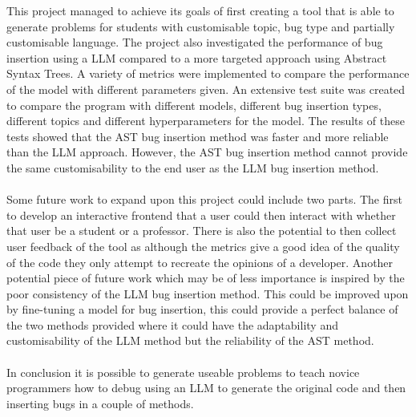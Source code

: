 \documentclass[12pt]{extarticle}
\begin{document}
This project managed to achieve its goals of first creating a tool that is able to generate problems for students with customisable topic, bug type and partially customisable language. The project also investigated the performance of bug insertion using a LLM compared to a more targeted approach using Abstract Syntax Trees. A variety of metrics were implemented to compare the performance of the model with different parameters given. An extensive test suite was created to compare the program with different models, different bug insertion types, different topics and different hyperparameters for the model. The results of these tests showed that the AST bug insertion method was faster and more reliable than the LLM approach. However, the AST bug insertion method cannot provide the same customisability to the end user as the LLM bug insertion method.\\
\\
Some future work to expand upon this project could include two parts. The first to develop an interactive frontend that a user could then interact with whether that user be a student or a professor. There is also the potential to then collect user feedback of the tool as although the metrics give a good idea of the quality of the code they only attempt to recreate the opinions of a developer. Another potential piece of future work which may be of less importance is inspired by the poor consistency of the LLM bug insertion method. This could be improved upon by fine-tuning a model for bug insertion, this could provide a perfect balance of the two methods provided where it could have the adaptability and customisability of the LLM method but the reliability of the AST method.\\
\\
In conclusion it is possible to generate useable problems to teach novice programmers how to debug using an LLM to generate the original code and then inserting bugs in a couple of methods.
\end{document}
